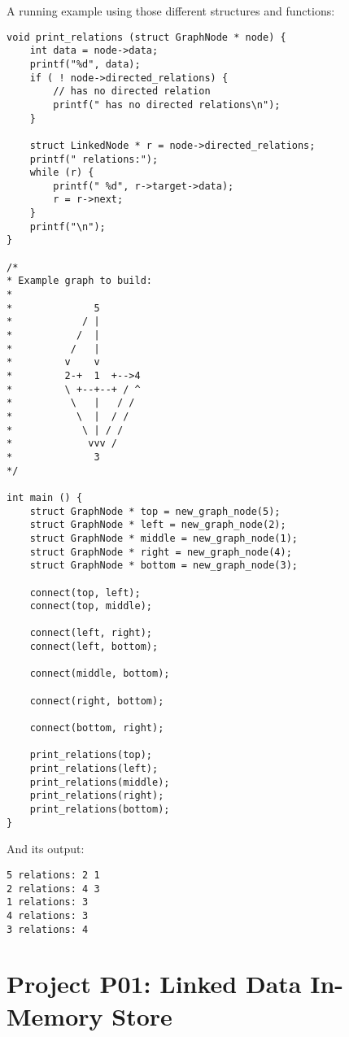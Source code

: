 A running example using those different structures and functions:
\begin{lstlisting}
void print_relations (struct GraphNode * node) {
    int data = node->data;
    printf("%d", data);
    if ( ! node->directed_relations) {
        // has no directed relation
        printf(" has no directed relations\n");
    }

    struct LinkedNode * r = node->directed_relations;
    printf(" relations:");
    while (r) {
        printf(" %d", r->target->data);
        r = r->next;
    }
    printf("\n");
}

/*
* Example graph to build:
*
*              5
*            / |
*           /  |
*          /   |
*         v    v
*         2-+  1  +-->4
*         \ +--+--+ / ^
*          \   |   / /
*           \  |  / /
*            \ | / /
*             vvv /
*              3
*/

int main () {
    struct GraphNode * top = new_graph_node(5);
    struct GraphNode * left = new_graph_node(2);
    struct GraphNode * middle = new_graph_node(1);
    struct GraphNode * right = new_graph_node(4);
    struct GraphNode * bottom = new_graph_node(3);

    connect(top, left);
    connect(top, middle);

    connect(left, right);
    connect(left, bottom);

    connect(middle, bottom);

    connect(right, bottom);

    connect(bottom, right);

    print_relations(top);
    print_relations(left);
    print_relations(middle);
    print_relations(right);
    print_relations(bottom);
}
\end{lstlisting}

And its output:

\begin{lstlisting}[language={}]
5 relations: 2 1
2 relations: 4 3
1 relations: 3
4 relations: 3
3 relations: 4
\end{lstlisting}



%
%
\section{Project P01: Linked Data In-Memory Store}



